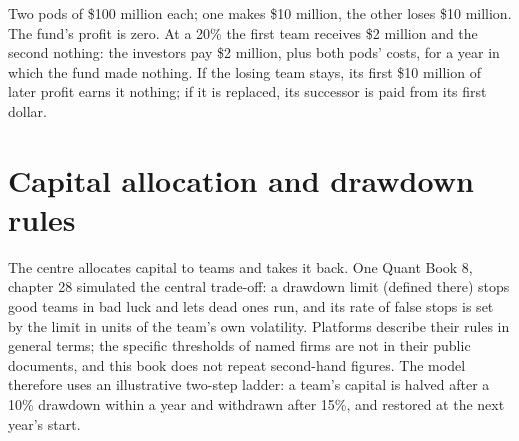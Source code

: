 \begin{omfigure}

\label{fig:fm:the-multi-manager-platform:netting}
\end{omfigure}

\begin{example}\label{ex:fm:the-multi-manager-platform:two}
Two pods of \$100 million each; one makes \$10 million, the other loses \$10 million. The fund's profit is zero. At a 20\%  the first
team receives \$2 million and the second nothing: the investors pay \$2 million, plus both pods' costs, for a year in which the fund made nothing.
If the losing team stays, its first \$10 million of later profit earns it nothing; if it is replaced, its successor is paid from its first dollar.
\end{example}

\section{Capital allocation and drawdown rules}

The centre allocates capital to teams and takes it back. One Quant Book 8, chapter 28 simulated the central trade-off: a drawdown limit
(defined there) stops good teams in bad luck and lets dead ones run, and its rate of false stops is set by the limit in units of the team's own
volatility. Platforms describe their rules in general terms; the specific thresholds of named firms are not in their public documents, and this
book does not repeat second-hand figures. The model therefore uses an illustrative two-step ladder: a team's capital is halved after a 10\%
drawdown within a year and withdrawn after 15\%, and restored at the next year's start.

